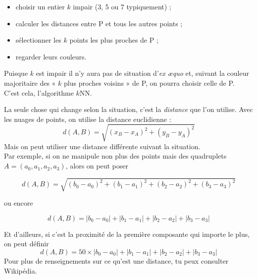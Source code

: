 \medskip\par



\begin{methode}[ : kNN]
\begin{itemize}
	\item choisir un entier $k$ impair (3, 5 ou 7 typiquement) ;
	\item calculer les distances entre P et tous les autres points ;
	\item sélectionner les $k$ points les plus proches de P ;	
	\item regarder leurs couleurs.
\end{itemize}
Puisque $k$ est impair il n'y aura pas de situation d'\textit{ex æquo} et, suivant la couleur majoritaire des « $k$ plus proches voisins » de P, on pourra choisir celle de P.\\

C'est cela, l'algorithme $k$NN.
\end{methode}

La seule chose qui change selon la situation, c'est la \textit{distance} que l'on utilise. Avec les nuages de points, on utilise la distance euclidienne :
$$d(A,B)=\sqrt{\left(x_B-x_A\right)^2+\left(y_B-y_A\right)^2}$$
Mais on peut utiliser une distance différente suivant la situation.\\
Par exemple, si on ne manipule non plus des points mais des quadruplets $A=(a_0,a_1,a_2,a_3)$, alors on peut poser

$$d(A,B)=\sqrt{(b_0-a_0)^2+(b_1-a_1)^2+(b_2-a_2)^2+(b_3-a_3)^2}$$

ou encore

$$d(A,B)=|b_0-a_0|+|b_1-a_1|+|b_2-a_2|+|b_3-a_3| $$

Et d'ailleurs, si c'est la proximité de la première composante qui importe le plus, on peut définir
$$d(A,B) =50 \times |b_0-a_0|+|b_1-a_1|+|b_2-a_2|+|b_3-a_3|$$
Pour plus de renseignements sur ce qu'est une distance, tu peux consulter Wikipédia.

